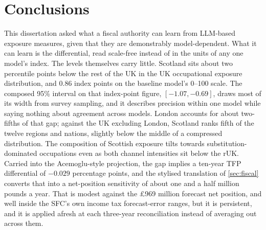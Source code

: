 \section{Conclusions}\label{sec:conclusion}

This dissertation asked what a fiscal authority can learn from LLM-based exposure measures, given that they are demonstrably model-dependent. What it can learn is the differential, read scale-free instead of in the units of any one model's index. The levels themselves carry little. Scotland sits about two percentile points below the rest of the UK in the UK occupational exposure distribution, and 0.86 index points on the baseline model's 0--100 scale. The composed 95\% interval on that index-point figure, $[-1.07, -0.69]$, draws most of its width from survey sampling, and it describes precision within one model while saying nothing about agreement across models. London accounts for about two-fifths of that gap; against the UK excluding London, Scotland ranks fifth of the twelve regions and nations, slightly below the middle of a compressed distribution. The composition of Scottish exposure tilts towards substitution-dominated occupations even as both channel intensities sit below the rUK. Carried into the Acemoglu-style projection, the gap implies a ten-year TFP differential of $-0.029$ percentage points, and the stylised translation of \cref{sec:fiscal} converts that into a net-position sensitivity of about one and a half million pounds a year. That is modest against the \pounds969 million forecast net position, and well inside the SFC's own income tax forecast-error ranges, but it is persistent, and it is applied afresh at each three-year reconciliation instead of averaging out across them.

